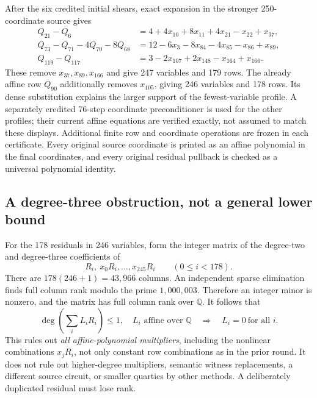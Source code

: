 After the six credited initial shears, exact expansion in the stronger
250-coordinate source gives
\begin{align*}
 Q_{21}-Q_6&=4+4x_{10}+8x_{11}+4x_{21}-x_{22}+x_{37},\\
 Q_{73}-Q_{71}-4Q_{70}-8Q_{68}
 &=12-6x_3-8x_{84}-4x_{85}-x_{86}+x_{89},\\
 Q_{119}-Q_{117}&=3-2x_{107}+2x_{148}-x_{164}+x_{166}.
\end{align*}
These remove $x_{37},x_{89},x_{166}$ and give 247 variables and 179 rows.
The already affine row $Q_{90}$ additionally removes $x_{105}$, giving
246 variables and 178 rows.  Its dense substitution explains the larger
support of the fewest-variable profile.  A separately credited 76-step
coordinate preconditioner is used for the other profiles; their current
affine equations are verified exactly, not assumed to match these displays.
Additional finite row and coordinate operations are frozen in each
certificate.  Every original source coordinate is printed as an affine
polynomial in the final coordinates, and every original residual pullback
is checked as a universal polynomial identity.

\subsection{A degree-three obstruction, not a general lower bound}
For the 178 residuals in 246 variables, form the integer matrix of the
degree-two and degree-three coefficients of
\[
 R_i,\ x_0R_i,\ldots,x_{245}R_i\qquad(0\le i<178).
\]
There are $178(246+1)=43,966$ columns.  An independent sparse elimination
finds full column rank modulo the prime $1,000,003$.  Therefore an integer
minor is nonzero, and the matrix has full column rank over $\mathbb Q$.
It follows that
\[
 \deg\!\left(\sum_i L_iR_i\right)\le1,
 \quad L_i\text{ affine over }\mathbb Q
 \quad\Longrightarrow\quad L_i=0\ \text{for all }i.
\]
This rules out \emph{all affine-polynomial multipliers}, including the
nonlinear combinations $x_jR_i$, not only constant row combinations as in
the prior round.  It does not rule out higher-degree multipliers, semantic
witness replacements, a different source circuit, or smaller quartics by
other methods.  A deliberately duplicated residual must lose rank.

